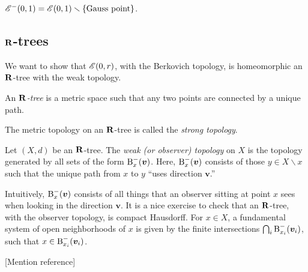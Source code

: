 \begin{example}
$\mathscr{E}^-(0,1)=\mathscr{E}(0,1)\smallsetminus \{\text{Gauss point}\}$. 
\end{example}





\subsection{\texorpdfstring{$\mathbf{R}$}{R}-trees}

We want to show that $\mathscr{E}(0,r)$, with the Berkovich topology, is homeomorphic 
an $\mathbf{R}$-tree with the weak topology. 

\begin{definition}
An \emph{$\mathbf{R}$-tree} is a metric space such that any two points are connected 
by a unique path.
\end{definition}

The metric topology on an $\mathbf{R}$-tree is called the \emph{strong topology}. 

\begin{definition}
Let $(X,d)$ be an $\mathbf{R}$-tree. The \emph{weak (or observer) topology} on $X$ is 
the topology generated by all sets of the form $\operatorname{B}_x^-(\bm v)$. Here, 
$\operatorname{B}_x^-(\bm v)$ consists of those $y\in X\smallsetminus x$ such that the unique 
path from $x$ to $y$ ``uses direction $\bm v$.''
\end{definition}

Intuitively, $\operatorname{B}_x^-(\bm v)$ consists of all things that an observer sitting at 
point $x$ sees when looking in the direction $\bm v$. It is a nice exercise to 
check that an $\mathbf{R}$-tree, with the observer topology, is compact Hausdorff. For 
$x\in X$, a fundamental system of open neighborhoods of $x$ is given by the 
finite intersections $\bigcap_i \operatorname{B}_{x_i}^-(\bm v_i)$, such that 
$x\in \operatorname{B}_{x_i}^-(\bm v_i)$. 

[Mention reference]

